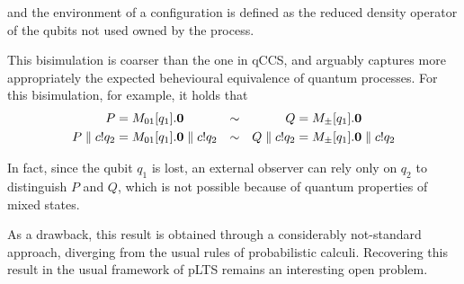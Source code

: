 and the environment of a configuration is defined as the reduced density operator of the qubits not used owned by the process.

This bisimulation is coarser than the one in qCCS, and arguably captures more appropriately the expected behevioural equivalence of quantum processes. For this bisimulation, for example, it holds that 
\begin{align*}
 P &= M_{01}[q_1].\mathbf{0} &\sim & & Q &= M_\pm[q_1].\mathbf{0} \\ 
 P \parallel c!q_2 &=  M_{01}[q_1].\mathbf{0} \parallel c!q_2 &\sim & & Q \parallel c!q_2 &=  M_\pm[q_1].\mathbf{0} \parallel c!q_2 
\end{align*} 

In fact, since the qubit $q_1$ is lost, an external observer can rely only on $q_2$ to distinguish $P$ and $Q$, which is not possible because of quantum properties of mixed states. 

As a drawback, this result is obtained through a considerably not-standard approach, diverging from the usual rules of probabilistic calculi. Recovering this result in the usual framework of pLTS remains an interesting open problem.
